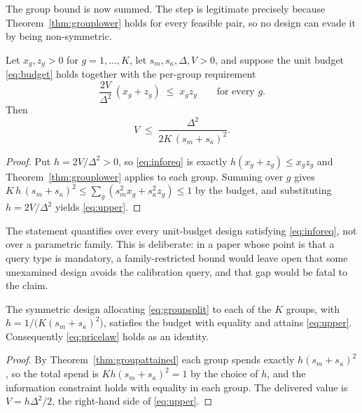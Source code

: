 The group bound is now summed. The step is legitimate precisely because
Theorem~\ref{thm:grouplower} holds for every feasible pair, so no design can evade it by
being non-symmetric.

\begin{theorem}
\label{thm:upper}
Let $x_{g},z_{g}>0$ for $g=1,\dots,K$, let $s_{m},s_{\kappa},\Delta,V>0$, and suppose the
unit budget \eqref{eq:budget} holds together with the per-group requirement
\begin{equation}
\frac{2V}{\Delta^{2}}\,(x_{g}+z_{g}) \;\le\; x_{g}z_{g}
\qquad\text{for every } g .
\label{eq:inforeq}
\end{equation}
Then
\begin{equation}
V \;\le\; \frac{\Delta^{2}}{2K\,(s_{m}+s_{\kappa})^{2}} .
\label{eq:upper}
\end{equation}
\end{theorem}

\begin{proof}
Put $h=2V/\Delta^{2}>0$, so \eqref{eq:inforeq} is exactly $h(x_{g}+z_{g})\le x_{g}z_{g}$ and
Theorem~\ref{thm:grouplower} applies to each group. Summing over $g$ gives
$K\,h\,(s_{m}+s_{\kappa})^{2}\le\sum_{g}(s_{m}^{2}x_{g}+s_{\kappa}^{2}z_{g})\le1$ by the
budget, and substituting $h=2V/\Delta^{2}$ yields \eqref{eq:upper}.
\end{proof}


The statement quantifies over every unit-budget design satisfying \eqref{eq:inforeq}, not
over a parametric family. This is deliberate: in a paper whose point is that a query type is
mandatory, a family-restricted bound would leave open that some unexamined design avoids the
calibration query, and that gap would be fatal to the claim.

\begin{theorem}
\label{thm:attained}
The symmetric design allocating \eqref{eq:groupsplit} to each of the $K$ groups, with
$h=1/\bigl(K(s_{m}+s_{\kappa})^{2}\bigr)$, satisfies the budget with equality and attains
\eqref{eq:upper}. Consequently \eqref{eq:pricelaw} holds as an identity.
\end{theorem}

\begin{proof}
By Theorem~\ref{thm:groupattained} each group spends exactly $h(s_{m}+s_{\kappa})^{2}$, so
the total spend is $Kh(s_{m}+s_{\kappa})^{2}=1$ by the choice of $h$, and the information
constraint holds with equality in each group. The delivered value is
$V=h\Delta^{2}/2$, the right-hand side of \eqref{eq:upper}.
\end{proof}

